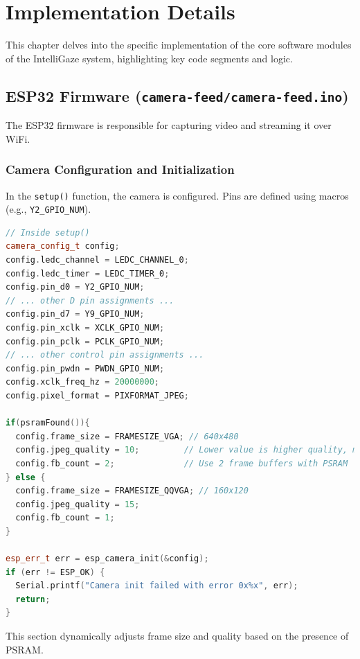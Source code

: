 \documentclass[12pt, a4paper]{report}
\begin{document}
\chapter{Implementation Details}
This chapter delves into the specific implementation of the core software modules of the IntelliGaze system, highlighting key code segments and logic.

\section{ESP32 Firmware (\texttt{camera-feed/camera-feed.ino})}
The ESP32 firmware is responsible for capturing video and streaming it over WiFi.
\subsection{Camera Configuration and Initialization}
In the \texttt{setup()} function, the camera is configured. Pins are defined using macros (e.g., \texttt{Y2\_GPIO\_NUM}).

\begin{lstlisting}[language=C++, caption={ESP32 Camera Configuration Snippet from setup()}, label={lst:esp32_cam_config_ch4}] % Changed label
// Inside setup()
camera_config_t config;
config.ledc_channel = LEDC_CHANNEL_0;
config.ledc_timer = LEDC_TIMER_0;
config.pin_d0 = Y2_GPIO_NUM;
// ... other D pin assignments ...
config.pin_d7 = Y9_GPIO_NUM;
config.pin_xclk = XCLK_GPIO_NUM;
config.pin_pclk = PCLK_GPIO_NUM;
// ... other control pin assignments ...
config.pin_pwdn = PWDN_GPIO_NUM;
config.xclk_freq_hz = 20000000;
config.pixel_format = PIXFORMAT_JPEG;

if(psramFound()){
  config.frame_size = FRAMESIZE_VGA; // 640x480
  config.jpeg_quality = 10;         // Lower value is higher quality, more data
  config.fb_count = 2;              // Use 2 frame buffers with PSRAM
} else {
  config.frame_size = FRAMESIZE_QQVGA; // 160x120
  config.jpeg_quality = 15;
  config.fb_count = 1;
}

esp_err_t err = esp_camera_init(&config);
if (err != ESP_OK) {
  Serial.printf("Camera init failed with error 0x%x", err);
  return;
}
\end{lstlisting}
This section dynamically adjusts frame size and quality based on the presence of PSRAM.
\end{document}

